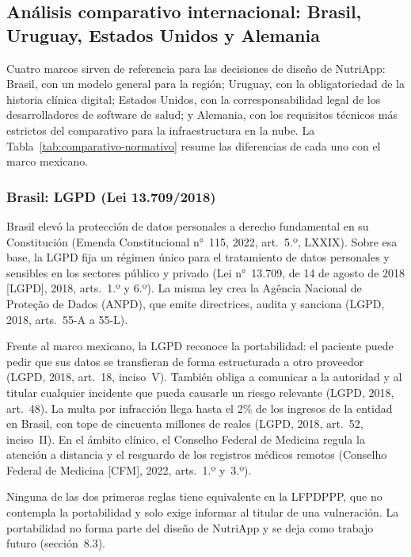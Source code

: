 \documentclass[12pt, a4paper]{article}
\begin{document}
\subsection{Análisis comparativo internacional: Brasil, Uruguay,
Estados Unidos y Alemania}

Cuatro marcos sirven de referencia para las decisiones de diseño de
NutriApp: Brasil, con un modelo general para la región; Uruguay, con
la obligatoriedad de la historia clínica digital; Estados Unidos, con
la corresponsabilidad legal de los desarrolladores de software de
salud; y Alemania, con los requisitos técnicos más estrictos del
comparativo para la infraestructura en la nube. La
Tabla~\ref{tab:comparativo-normativo} resume las diferencias de cada
uno con el marco mexicano.

\subsubsection{Brasil: LGPD (Lei 13.709/2018)}

Brasil elevó la protección de datos personales a derecho fundamental
en su Constitución (Emenda Constitucional n°~115, 2022, art.~5.º,
LXXIX). Sobre esa base, la LGPD fija un régimen único para el
tratamiento de datos personales y sensibles en los sectores público y
privado (Lei n°~13.709, de 14 de agosto de 2018 [LGPD], 2018,
arts.~1.º y 6.º). La misma ley crea la Agência Nacional de
Proteção de Dados (ANPD), que emite directrices, audita y sanciona (LGPD,
2018, arts.~55-A a 55-L).
 
Frente al marco mexicano, la LGPD reconoce la portabilidad: el paciente
puede pedir que sus datos se transfieran de forma estructurada a otro
proveedor (LGPD, 2018, art.~18, inciso~V). También obliga a comunicar a
la autoridad y al titular cualquier incidente que pueda causarle un
riesgo relevante (LGPD, 2018, art.~48). La
multa por infracción llega hasta el 2\% de los ingresos de la entidad
en Brasil, con tope de cincuenta millones de reales (LGPD, 2018,
art.~52, inciso~II). En el ámbito clínico, el Conselho Federal de
Medicina regula la atención a distancia y el resguardo de los
registros médicos remotos (Conselho Federal de Medicina [CFM], 2022,
arts.~1.º y~3.º).
 
Ninguna de las dos primeras reglas tiene equivalente en la LFPDPPP, que
no contempla la portabilidad y solo exige informar al titular de una
vulneración. La portabilidad no forma parte del diseño de NutriApp y se
deja como trabajo futuro (sección~8.3).
\end{document}
